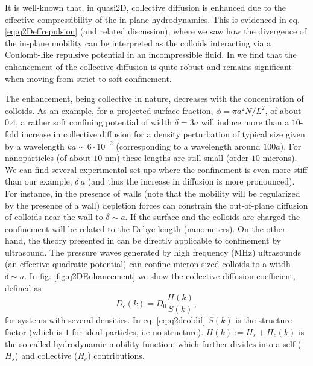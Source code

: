 \documentclass[ twoside,openright,titlepage,numbers=noenddot,%
headinclude,footinclude,cleardoublepage=empty,abstract=on,
BCOR=5mm,paper=a4,fontsize=11pt, dvipsnames
]{scrreprt}
\begin{document}
  It is well-known that, in quasi2D, collective diffusion is enhanced due to the effective compressibility of the in-plane hydrodynamics. This is evidenced in eq. \eqref{eq:q2Deffrepulsion} (and related discussion), where we saw how the divergence of the in-plane mobility can be interpreted as the colloids interacting via a Coulomb-like repulsive potential in an incompressible fluid. In \cite{Pelaez2017} we find that the enhancement of the collective diffusion is quite robust and remains significant when moving from strict to soft confinement.

  The enhancement, being collective in nature, decreases with the concentration of colloids. As an example, for a projected surface fraction, $\phi = \pi a^2N/L^2$, of about $0.4$, a rather soft confining potential of width $\delta = 3a$ will induce more than a $10$-fold increase in collective diffusion for a density perturbation of typical size given by a wavelength $ka \sim 6\cdot 10^{-2}$ (corresponding to a wavelength around $100a$). For nanoparticles (of about $10$ nm) these lengths are still small (order $10$ microns). We can find several experimental set-ups where the confinement is even more stiff than our example, $\delta ~a$ (and thus the increase in diffusion is more pronounced). For instance, in the presence of walls (note that the mobility will be regularized by the presence of a wall) depletion forces can constrain the out-of-plane diffusion of colloids near the wall to $\delta\sim a$. If the surface and the colloids are charged the confinement will be related to the Debye length (nanometers). On the other hand, the theory presented in \cite{Pelaez2017} can be directly applicable to confinement by ultrasound. The pressure waves generated by high frequency (MHz) ultrasounds (an effective quadratic potential) can confine micron-sized colloids to a witdh $\delta \sim a$.
  In fig. \ref{fig:q2DEnhancement} we show the collective diffusion coefficient, defined as
  \begin{equation}
    \label{eq:q2dcoldif}
    D_c(k) = D_0\frac{H(k)}{S(k)},
  \end{equation}
  for systems with several densities.
  In eq. \eqref{eq:q2dcoldif} $S(k)$ is the structure factor (which is $1$ for ideal particles, i.e no structure). $H(k):= H_s + H_c(k)$ is the so-called hydrodynamic mobility function, which further divides into a self ($H_s$) and collective ($H_c$) contributions.
\end{document}
